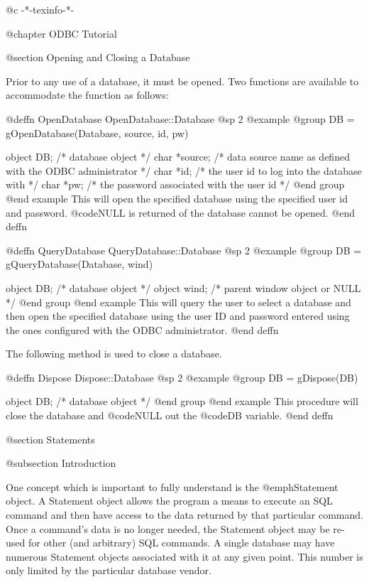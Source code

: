 @c -*-texinfo-*-

@chapter ODBC Tutorial

@section Opening and Closing a Database

Prior to any use of a database, it must be opened.  Two functions are
available to accommodate the function as follows:

@deffn {OpenDatabase} OpenDatabase::Database
@sp 2
@example
@group
DB = gOpenDatabase(Database, source, id, pw)

object  DB;             /*  database object  */
char    *source;        /*  data source name as defined with
                            the ODBC administrator  */
char    *id;            /*  the user id to log into the
                            database with  */
char    *pw;            /*  the password associated with
                            the user id   */
@end group
@end example
This will open the specified database using the specified user id and password.
@code{NULL} is returned of the database cannot be opened.
@end deffn

@deffn {QueryDatabase} QueryDatabase::Database
@sp 2
@example
@group
DB = gQueryDatabase(Database, wind)

object  DB;             /*  database object  */
object  wind;           /*  parent window object or NULL  */
@end group
@end example
This will query the user to select a database and then open the specified database
using the user ID and password entered using the ones configured with the ODBC administrator.
@end deffn

The following method is used to close a database.

@deffn {Dispose}  Dispose::Database
@sp 2
@example
@group
DB = gDispose(DB)

object  DB;             /*  database object  */
@end group
@end example
This procedure will close the database and @code{NULL} out the @code{DB} variable.
@end deffn




@section Statements

@subsection Introduction

One concept which is important to fully understand is the
@emph{Statement} object.  A Statement object allows the program a means
to execute an SQL command and then have access to the data returned by
that particular command.  Once a command's data is no longer needed, the
Statement object may be re-used for other (and arbitrary) SQL commands.
A single database may have numerous Statement objects associated with it
at any given point.  This number is only limited by the particular
database vendor.

